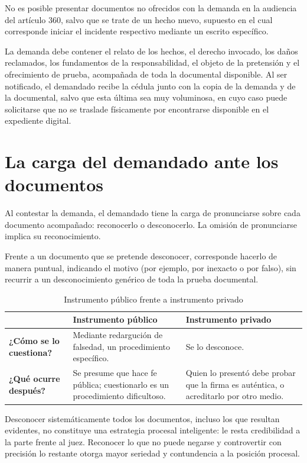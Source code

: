 \documentclass[12pt,oneside]{book}
\begin{document}
\begin{note}
No es posible presentar documentos no ofrecidos con la demanda en la audiencia del artículo 360, salvo que se trate de un hecho nuevo, supuesto en el cual corresponde iniciar el incidente respectivo mediante un escrito específico.
\end{note}

La demanda debe contener el relato de los hechos, el derecho invocado, los daños reclamados, los fundamentos de la responsabilidad, el objeto de la pretensión y el ofrecimiento de prueba, acompañada de toda la documental disponible. Al ser notificado, el demandado recibe la cédula junto con la copia de la demanda y de la documental, salvo que esta última sea muy voluminosa, en cuyo caso puede solicitarse que no se traslade físicamente por encontrarse disponible en el expediente digital.

\section{La carga del demandado ante los documentos}

Al contestar la demanda, el demandado tiene la carga de pronunciarse sobre cada documento acompañado: reconocerlo o desconocerlo. La omisión de pronunciarse implica su reconocimiento.

Frente a un documento que se pretende desconocer, corresponde hacerlo de manera puntual, indicando el motivo (por ejemplo, por inexacto o por falso), sin recurrir a un desconocimiento genérico de toda la prueba documental.

\begin{table}[H]
\centering
\caption{Instrumento público frente a instrumento privado}
\begin{tabularx}{\textwidth}{>{\raggedright\arraybackslash}p{} X X}
\toprule
 & \textbf{Instrumento público} & \textbf{Instrumento privado} \\
\midrule
\textbf{¿Cómo se lo cuestiona?} & Mediante redargución de falsedad, un procedimiento específico. & Se lo desconoce. \\
\textbf{¿Qué ocurre después?} & Se presume que hace fe pública; cuestionarlo es un procedimiento dificultoso. & Quien lo presentó debe probar que la firma es auténtica, o acreditarlo por otro medio. \\
\bottomrule
\end{tabularx}
\end{table}

\begin{important}
Desconocer sistemáticamente todos los documentos, incluso los que resultan evidentes, no constituye una estrategia procesal inteligente: le resta credibilidad a la parte frente al juez. Reconocer lo que no puede negarse y controvertir con precisión lo restante otorga mayor seriedad y contundencia a la posición procesal.
\end{important}
\end{document}
